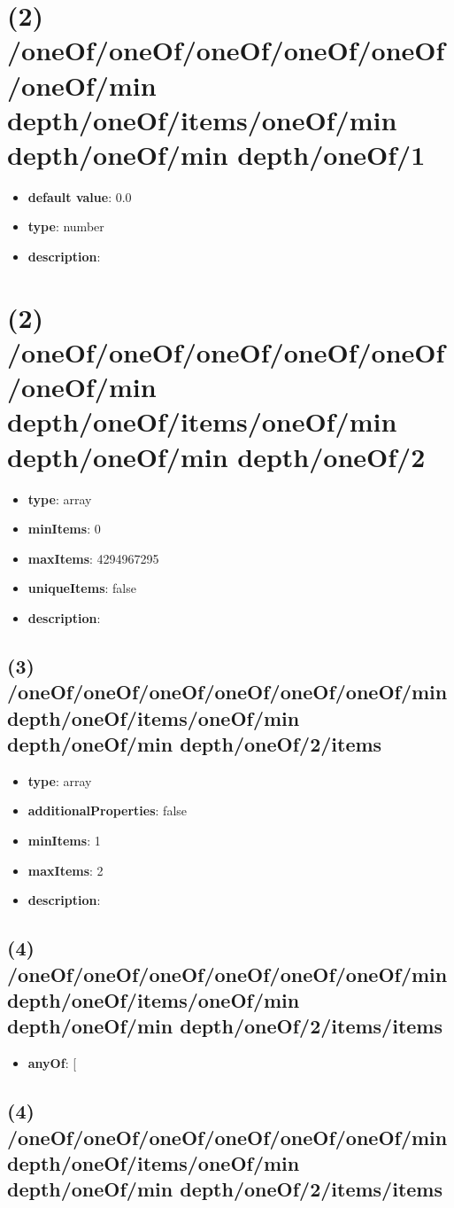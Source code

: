 \section{(2) /oneOf/oneOf/oneOf/oneOf/oneOf/oneOf/min depth/oneOf/items/oneOf/min depth/oneOf/min depth/oneOf/1}
\begin{itemize}[leftmargin=2em]\item {\bf default value}: 0.0
\item {\bf type}: number
\item {\bf description}: 
\end{itemize}\section{(2) /oneOf/oneOf/oneOf/oneOf/oneOf/oneOf/min depth/oneOf/items/oneOf/min depth/oneOf/min depth/oneOf/2}
\begin{itemize}[leftmargin=2em]\item {\bf type}: array
\item {\bf minItems}: 0
\item {\bf maxItems}: 4294967295
\item {\bf uniqueItems}: false
\item {\bf description}: 
\end{itemize}\subsection{(3) /oneOf/oneOf/oneOf/oneOf/oneOf/oneOf/min depth/oneOf/items/oneOf/min depth/oneOf/min depth/oneOf/2/items}
\begin{itemize}[leftmargin=3em]\item {\bf type}: array
\item {\bf additionalProperties}: false
\item {\bf minItems}: 1
\item {\bf maxItems}: 2
\item {\bf description}: 
\end{itemize}\subsection{(4) /oneOf/oneOf/oneOf/oneOf/oneOf/oneOf/min depth/oneOf/items/oneOf/min depth/oneOf/min depth/oneOf/2/items/items}
\begin{itemize}[leftmargin=4em]\item {\bf anyOf}: [\end{itemize}\subsection{(4) /oneOf/oneOf/oneOf/oneOf/oneOf/oneOf/min depth/oneOf/items/oneOf/min depth/oneOf/min depth/oneOf/2/items/items}
